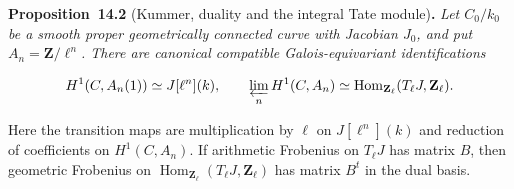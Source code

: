 \documentclass[11pt]{article}
\newenvironment{bpstatement}[2]{\par\addvspace{0.6\baselineskip}\noindent\textbf{#1}#2\textbf{.}\enspace\ignorespaces}
  {\par\addvspace{0.4\baselineskip}}
\newenvironment{bpstatementit}[2]{\begin{bpstatement}{#1}{#2}\itshape\ignorespaces}{\end{bpstatement}}
\providecommand{\Hom}{}\renewcommand{\Hom}{\operatorname{Hom}}
\begin{document}
\label{bp10}%
\begin{bpstatementit}{Proposition~14.2}{ (Kummer, duality and the integral Tate module)}
Let \(C_0/k_0\) be a smooth proper geometrically connected curve with Jacobian \(J_0\), and put \(A_n=\mathbf Z/\ell^n\).  There are canonical compatible Galois-equivariant identifications

\[
H^1(C,A_n(1))\simeq J[\ell^n](k),\qquad
\varprojlim_n H^1(C,A_n)
\simeq\Hom_{\mathbf Z_\ell}(T_\ell J,\mathbf Z_\ell).
\]

Here the transition maps are multiplication by \(\ell\) on \(J[\ell^n](k)\) and reduction of coefficients on \(H^1(C,A_n)\).  If arithmetic Frobenius on \(T_\ell J\) has matrix \(B\), then geometric Frobenius on \(\Hom_{\mathbf Z_\ell}(T_\ell J,\mathbf Z_\ell)\) has matrix \(B^t\) in the dual basis.
\end{bpstatementit}
\end{document}
